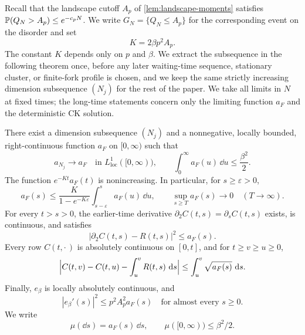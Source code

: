 Recall that the landscape cutoff $A_p$ of \cref{lem:landscape-moments} satisfies $\mathbb P(Q_N>A_p)\le e^{-c_pN}$. We write $G_N=\{Q_N\le A_p\}$ for the corresponding event on the disorder and set
\[
 K=2\beta p^2A_p.
\]
The constant $K$ depends only on $p$ and $\beta$. We extract the subsequence in the following theorem once, before any later waiting-time sequence, stationary cluster, or finite-fork profile is chosen, and we keep the same strictly increasing dimension subsequence $(N_j)$ for the rest of the paper. We take all limits in $N$ at fixed times; the long-time statements concern only the limiting function $a_F$ and the deterministic CK solution.

\begin{theorem}\label{thm:fisher-clock}
There exist a dimension subsequence $(N_j)$ and a nonnegative, locally bounded, right-continuous function $a_F$ on $[0,\infty)$ such that
\begin{equation}
 a_{N_j}\longrightarrow a_F\quad\text{in }L^1_{\mathrm{loc}}([0,\infty)),
 \qquad \int_0^\infty a_F(u)\,\dd u\le\frac{\beta^2}{2}.
 \label{eq:fisher-density-budget}
\end{equation}
The function $e^{-Kt}a_F(t)$ is nonincreasing. In particular, for $s\ge\varepsilon>0$,
\begin{equation}
 a_F(s)\le\frac{K}{1-e^{-K\varepsilon}}\int_{s-\varepsilon}^sa_F(u)\,\dd u,
 \qquad \sup_{s\ge T}a_F(s)\longrightarrow0\quad(T\to\infty).
 \label{eq:fisher-density-tail}
\end{equation}
For every $t>s>0$, the earlier-time derivative $\partial_2C(t,s)=\partial_sC(t,s)$ exists, is continuous, and satisfies
\begin{equation}
 |\partial_2C(t,s)-R(t,s)|^2\le a_F(s).
 \label{eq:fisher-global-fdt}
\end{equation}
Every row $C(t,\cdot\,)$ is absolutely continuous on $[0,t]$, and for $t\ge v\ge u\ge0$,
\begin{equation}
 \Bigl|C(t,v)-C(t,u)-\int_u^vR(t,s)\,\mathop{}\!\mathrm d s\Bigr|
 \le\int_u^v\sqrt{a_F(s)}\,\mathop{}\!\mathrm d s.
 \label{eq:fisher-global-row}
\end{equation}
Finally, $e_\beta$ is locally absolutely continuous, and
\begin{equation}
 |e_\beta'(s)|^2\le p^2A_p^2a_F(s)\quad\text{for almost every }s\ge0.
 \label{eq:fisher-energy-density}
\end{equation}
We write
\begin{equation}
 \mu(\dd s)=a_F(s)\,\dd s,
 \qquad \mu([0,\infty))\le\beta^2/2.
 \label{eq:entropy-measure}
\end{equation}
\end{theorem}

